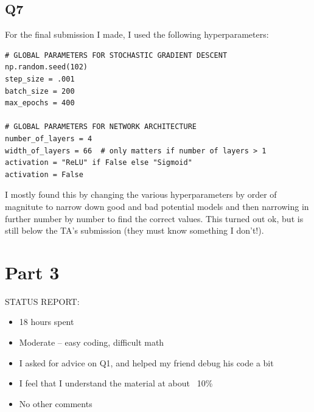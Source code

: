 \documentclass{article}
\theoremstyle{definition}
\begin{document}
    \subsection*{Q7}
    For the final submission I made, I used the following hyperparameters:
    \begin{verbatim}
# GLOBAL PARAMETERS FOR STOCHASTIC GRADIENT DESCENT
np.random.seed(102)
step_size = .001
batch_size = 200
max_epochs = 400

# GLOBAL PARAMETERS FOR NETWORK ARCHITECTURE
number_of_layers = 4
width_of_layers = 66  # only matters if number of layers > 1
activation = "ReLU" if False else "Sigmoid" 
activation = False
    \end{verbatim}
I mostly found this by changing the various hyperparameters by order of magnitute to 
narrow down good and bad potential models and then narrowing in further number by number to find the correct 
values. This turned out ok, but is still below the TA's submission (they must know something I don't!).
\section*{Part 3}
STATUS REPORT:
\begin{itemize}
    \item 18 hours spent
    \item Moderate -- easy coding, difficult math 
    \item I asked for advice on Q1, and helped my friend debug his code a bit 
    \item I feel that I understand the material at about ~10\%
    \item No other comments
\end{itemize}
\end{document}
